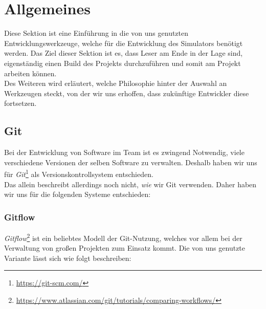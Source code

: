 
\section{Allgemeines}

Diese Sektion ist eine Einführung in die von uns genutzten Entwicklungswerkzeuge,
welche für die Entwicklung des Simulators benötigt werden. Das Ziel dieser Sektion
ist es, dass Leser am Ende in der Lage sind, eigenständig einen Build des Projekts
durchzuführen und somit am Projekt arbeiten können. \\
Des Weiteren wird erläutert, welche Philosophie hinter der Auswahl an Werkzeugen
steckt, von der wir uns erhoffen, dass zukünftige Entwickler diese fortsetzen.

\subsection{Git}
Bei der Entwicklung von Software im Team ist es zwingend Notwendig, viele verschiedene Versionen
der selben Software zu verwalten. Deshalb haben wir uns für
\textit{Git}\footnote{\url{https://git-scm.com/}} als Versionskontrollsystem entschieden. \\
Das allein beschreibt allerdings noch nicht, \textit{wie} wir Git verwenden. Daher haben wir uns für
die folgenden Systeme entschieden:

\subsubsection{Gitflow}

\textit{Gitflow}\footnote{\url{https://www.atlassian.com/git/tutorials/comparing-workflows/}} ist
ein beliebtes Modell der Git-Nutzung, welches vor allem bei der Verwaltung von großen Projekten
zum Einsatz kommt. Die von uns genutzte Variante lässt sich wie folgt beschreiben:


